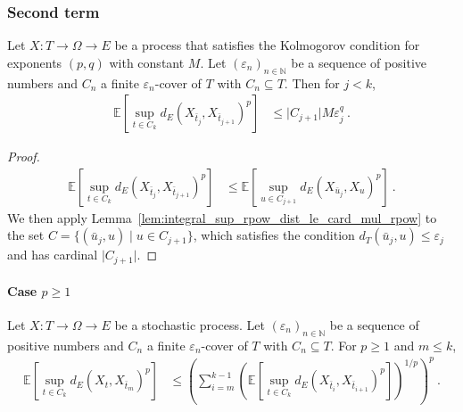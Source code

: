 \subsubsection{Second term}


\begin{lemma}\label{lem:integral_sup_rpow_dist_succ}
  \leanok
Let $X : T \to \Omega \to E$ be a process that satisfies the Kolmogorov condition for exponents $(p,q)$ with constant $M$.
Let $(\varepsilon_n)_{n \in \mathbb{N}}$ be a sequence of positive numbers and $C_n$ a finite $\varepsilon_n$-cover of $T$ with $C_n \subseteq T$.
Then for $j < k$,
\begin{align*}
  \mathbb{E}\left[\sup_{t \in C_k} d_E(X_{\bar{t}_j}, X_{\bar{t}_{j+1}})^p \right]
  &\le \vert C_{j+1} \vert M \varepsilon_j^q
  \: .
\end{align*}
\end{lemma}

\begin{proof}\leanok
\begin{align*}
  \mathbb{E}\left[\sup_{t \in C_k} d_E(X_{\bar{t}_j}, X_{\bar{t}_{j+1}})^p \right]
  &\le \mathbb{E}\left[\sup_{u \in C_{j+1}} d_E(X_{\bar{u}_j}, X_{u})^p \right]
  \: .
\end{align*}
We then apply Lemma~\ref{lem:integral_sup_rpow_dist_le_card_mul_rpow} to the set $C = \{(\bar{u}_j, u) \mid u \in C_{j+1}\}$, which satisfies the condition $d_T(\bar{u}_j, u) \le \varepsilon_j$ and has cardinal $\vert C_{j+1} \vert$.
\end{proof}



\paragraph{Case $p \ge 1$}


\begin{lemma}\label{lem:integral_sup_dist_le_sum_rpow}
  \leanok
Let $X : T \to \Omega \to E$ be a stochastic process.
Let $(\varepsilon_n)_{n \in \mathbb{N}}$ be a sequence of positive numbers and $C_n$ a finite $\varepsilon_n$-cover of $T$ with $C_n \subseteq T$.
For $p \ge 1$ and $m \le k$,
\begin{align*}
  \mathbb{E}\left[\sup_{t \in C_k} d_E(X_t, X_{\bar{t}_m})^p \right]
  &\le \left(\sum_{i=m}^{k-1} \left( \mathbb{E}\left[\sup_{t \in C_k} d_E(X_{\bar{t}_i}, X_{\bar{t}_{i+1}})^p\right] \right)^{1/p}\right)^p
  \: .
\end{align*}
\end{lemma}

